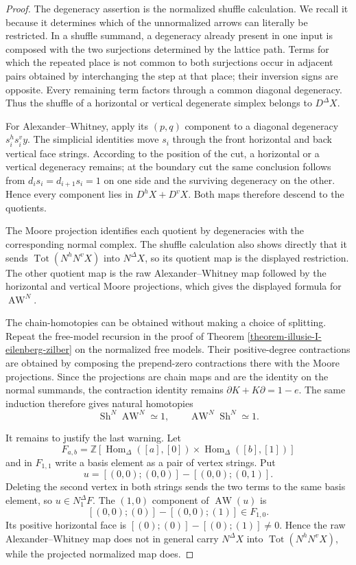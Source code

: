 \begin{proof}
The degeneracy assertion is the normalized shuffle calculation. We recall
it because it determines which of the unnormalized arrows can literally be
restricted. In a shuffle summand, a degeneracy already present in one input
is composed with the two surjections determined by the lattice path. Terms
for which the repeated place is not common to both surjections occur in
adjacent pairs obtained by interchanging the step at that place; their
inversion signs are opposite. Every remaining term factors through a common
diagonal degeneracy. Thus the shuffle of a horizontal or vertical degenerate
simplex belongs to $D^\Delta X$.

For Alexander--Whitney, apply its $(p,q)$ component to a diagonal degeneracy
$s_i^hs_i^v y$. The simplicial identities move $s_i$ through the front
horizontal and back vertical face strings. According to the position of the
cut, a horizontal or a vertical degeneracy remains; at the boundary cut the
same conclusion follows from $d_is_i=d_{i+1}s_i=1$ on one side and the
surviving degeneracy on the other. Hence every component lies in
$D^hX+D^vX$. Both maps therefore descend to the quotients.

The Moore projection identifies each quotient by degeneracies with the
corresponding normal complex. The shuffle calculation also shows directly
that it sends $\operatorname{Tot}(N^hN^vX)$ into $N^\Delta X$, so its
quotient map is the displayed restriction. The other quotient map is the raw
Alexander--Whitney map followed by the horizontal and vertical Moore
projections, which gives the displayed formula for $\operatorname{AW}^N$.

The chain-homotopies can be obtained without making a choice of splitting.
Repeat the free-model recursion in the proof of Theorem
\ref{theorem-illusie-I-eilenberg-zilber} on the normalized free models. Their
positive-degree contractions are obtained by composing the prepend-zero
contractions there with the Moore projections. Since the projections are
chain maps and are the identity on the normal summands, the contraction
identity remains $\partial K+K\partial=1-e$. The same induction therefore
gives natural homotopies
\[
 \operatorname{Sh}^N\operatorname{AW}^N\simeq 1,
 \qquad
 \operatorname{AW}^N\operatorname{Sh}^N\simeq 1.
\]

It remains to justify the last warning. Let
\[
 F_{a,b}=\mathbb Z[\operatorname{Hom}_\Delta([a],[0])\times
                         \operatorname{Hom}_\Delta([b],[1])]
\]
and in $F_{1,1}$ write a basis element as a pair of vertex strings. Put
\[
 u=[(0,0);(0,0)]-[(0,0);(0,1)].
\]
Deleting the second vertex in both strings sends the two terms to the same
basis element, so $u\in N^\Delta_1F$. The $(1,0)$ component of
$\operatorname{AW}(u)$ is
\[
 [(0,0);(0)]-[(0,0);(1)]\in F_{1,0}.
\]
Its positive horizontal face is
$[(0);(0)]-[(0);(1)]\neq0$. Hence the raw Alexander--Whitney map does not in
general carry $N^\Delta X$ into $\operatorname{Tot}(N^hN^vX)$, while the
projected normalized map does.
\end{proof}
